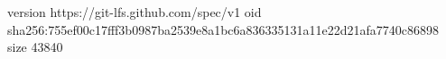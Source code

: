 version https://git-lfs.github.com/spec/v1
oid sha256:755ef00c17fff3b0987ba2539e8a1bc6a836335131a11e22d21afa7740c86898
size 43840

